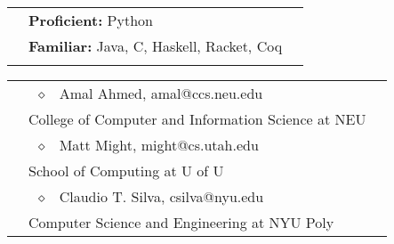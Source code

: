 \documentclass[10pt]{article}
\makeatletter
\newcommand{\category}[2]{
\begin{center}
\vskip 6pt
\begin{tabular*}{\textwidth}{@{}p{0.75in}@{\quad\;\;}p{4in}@{\quad\quad}p{0.7in}}
\vcrush[t]{1in}{\textsc{#1}} &
#2
\end{tabular*}
\end{center}
}
\newcommand{\n}{\\ & }
\newcommand{\conf}[1]{&\hspace{\stretch 1}\crushr{\textit{#1}}}
\newcommand{\citem}{~$\diamond$~}
\makeatother
\begin{document}
\category{Technical Skills}{
  {\bf Proficient:} Python \n
  {\bf Familiar:} Java, C, Haskell, Racket, Coq \n
}

\category{References}{
\citem
Amal Ahmed, amal@ccs.neu.edu \conf{Assistant Professor} \n
\quad College of Computer and Information Science at NEU \n
\citem
Matt Might, might@cs.utah.edu \conf{Associate Professor} \n
\quad School of Computing at U of U \n
\citem
Claudio T. Silva, csilva@nyu.edu \conf{Professor} \n
\quad Computer Science and Engineering at NYU Poly
}
\end{document}
